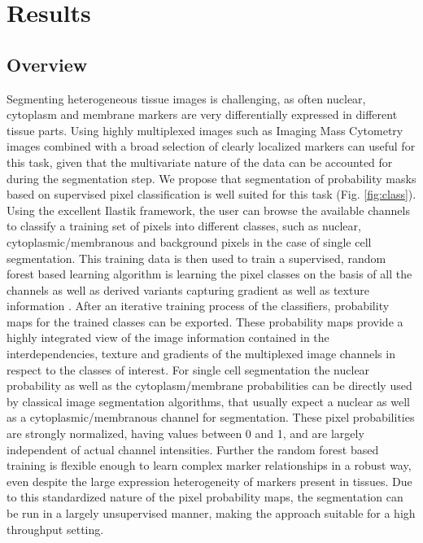 \documentclass[a4paper]{article}
\begin{document}
\section{Results}
\subsection{Overview}
Segmenting heterogeneous tissue images is challenging, as often nuclear, cytoplasm and membrane markers are very
differentially expressed in different tissue parts. Using highly multiplexed images such as Imaging
Mass Cytometry images combined with a broad selection of clearly localized markers can useful for
this task, given that the multivariate nature of the data can be accounted for during the
segmentation step. We propose that segmentation of probability masks based on supervised pixel
classification is well suited for this task (Fig. \ref{fig:class}). Using the excellent Ilastik framework, the user
can browse the available channels to classify a training set of pixels into different classes, such
as nuclear, cytoplasmic/membranous and background pixels in the case of single cell segmentation.
This training data is then used to train a supervised, random forest based learning
algorithm is learning the pixel classes on the basis of all the channels as well as derived variants capturing
gradient as well as texture information \cite{sommer_ilastik:_2011}. After an iterative training process of the
 classifiers, probability maps for the trained classes can be
exported. These probability maps provide a highly integrated view of the image information contained in the
interdependencies, texture and gradients of the multiplexed image channels in respect to the classes
of interest. For single cell segmentation the nuclear probability as well as the cytoplasm/membrane
probabilities can be directly used by classical image segmentation algorithms, that usually expect
a nuclear as well as a cytoplasmic/membranous channel for segmentation. These pixel probabilities
are strongly normalized, having values between 0 and 1, and are largely independent of actual
channel intensities. Further the random forest based training is flexible enough to learn complex marker
relationships in a robust way, even despite the large expression heterogeneity of markers present
in tissues.
Due to this standardized nature of the pixel probability maps, the segmentation can be run in a largely unsupervised manner,
making the approach suitable for a high throughput setting.
\end{document}
